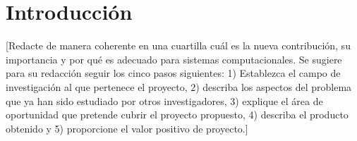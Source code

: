 \chapter*{Introducción}\label{introduccion}

[Redacte de manera coherente en una cuartilla cuál es la nueva contribución, su importancia y por qué es adecuado para sistemas computacionales. Se sugiere para su redacción seguir los cinco pasos siguientes: 1) Establezca el campo de investigación al que pertenece el proyecto, 2) describa los aspectos del problema que ya han sido estudiado por otros investigadores, 3) explique el área de oportunidad que pretende cubrir el proyecto propuesto, 4) describa el producto obtenido y 5) proporcione el valor positivo de proyecto.]




